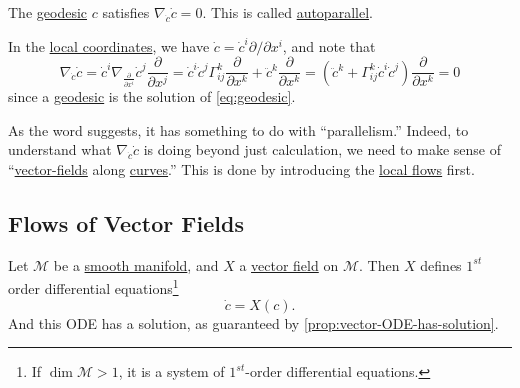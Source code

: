 \begin{eg}[Autoparallel]
	The \hyperref[def:geodesic]{geodesic} \(c\) satisfies \(\nabla _{\dot{c} } \dot{c} = 0\). This is called \hyperref[def:autoparallel]{autoparallel}.
\end{eg}
\begin{explanation}
	In the \hyperref[def:coordinate-chart]{local coordinates}, we have \(\dot{c} = \dot{c}^i \partial / \partial x^i\), and note that
	\[
		\nabla _{\dot{c}}\dot{c}
		= \dot{c}^i \nabla _{\frac{\partial }{\partial x^i} } \dot{c}^j \frac{\partial }{\partial x^j}
		= \dot{c}^i \dot{c}^j \Gamma _{ij}^k \frac{\partial }{\partial x^k} + \ddot{c}^k \frac{\partial }{\partial x^k}
		= \left( \ddot{c}^k + \Gamma _{ij}^k \dot{c}^i \dot{c}^j \right) \frac{\partial }{\partial x^k}
		= 0
	\]
	since a \hyperref[def:geodesic]{geodesic} is the solution of \autoref{eq:geodesic}.
\end{explanation}

As the word suggests, it has something to do with ``parallelism.'' Indeed, to understand what \(\nabla _{\dot{c} } \dot{c} \) is doing beyond just calculation, we need to make sense of ``\hyperref[def:vector-field]{vector-fields} along \hyperref[def:curve]{curves}.'' This is done by introducing the \hyperref[def:local-flow]{local flows} first.

\subsection{Flows of Vector Fields}
Let \(\mathcal{M} \) be a \hyperref[def:smooth-manifold]{smooth manifold}, and \(X\) a \hyperref[def:vector-field]{vector field} on \(\mathcal{M} \). Then \(X\) defines \(1^{st}\) order differential equations\footnote{If \(\dim \mathcal{M} > 1\), it is a system of \(1^{st} \)-order differential equations.}
\[
	\dot{c} = X(c).
\]
And this ODE has a solution, as guaranteed by \autoref{prop:vector-ODE-has-solution}.


